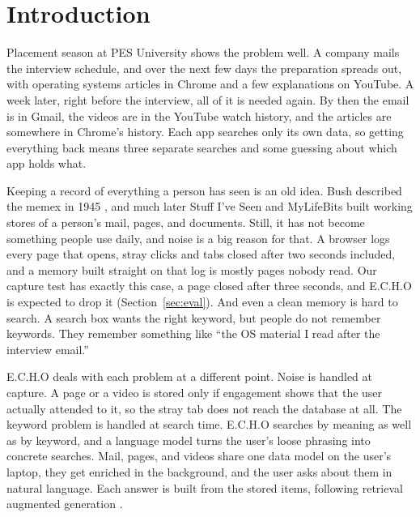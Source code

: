 \documentclass[conference]{IEEEtran}
\begin{document}
\section{Introduction}
Placement season at PES University shows the problem well. A company mails the interview schedule, and over the next few days the preparation spreads out, with operating systems articles in Chrome and a few explanations on YouTube. A week later, right before the interview, all of it is needed again. By then the email is in Gmail, the videos are in the YouTube watch history, and the articles are somewhere in Chrome's history. Each app searches only its own data, so getting everything back means three separate searches and some guessing about which app holds what.

Keeping a record of everything a person has seen is an old idea. Bush described the memex in 1945 \cite{b1}, and much later Stuff I've Seen \cite{b2} and MyLifeBits \cite{b3} built working stores of a person's mail, pages, and documents. Still, it has not become something people use daily, and noise is a big reason for that. A browser logs every page that opens, stray clicks and tabs closed after two seconds included, and a memory built straight on that log is mostly pages nobody read. Our capture test has exactly this case, a page closed after three seconds, and E.C.H.O is expected to drop it (Section~\ref{sec:eval}). And even a clean memory is hard to search. A search box wants the right keyword, but people do not remember keywords. They remember something like ``the OS material I read after the interview email.''

E.C.H.O deals with each problem at a different point. Noise is handled at capture. A page or a video is stored only if engagement shows that the user actually attended to it, so the stray tab does not reach the database at all. The keyword problem is handled at search time. E.C.H.O searches by meaning as well as by keyword, and a language model turns the user's loose phrasing into concrete searches. Mail, pages, and videos share one data model on the user's laptop, they get enriched in the background, and the user asks about them in natural language. Each answer is built from the stored items, following retrieval augmented generation \cite{b4}.
\end{document}
